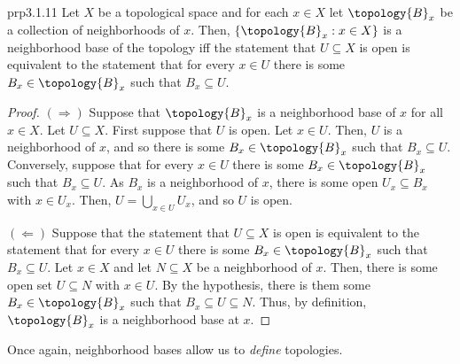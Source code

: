 \begin{prp}{}{prp3.1.11}
Let $X$ be a topological space and for each $x\in X$ let $\topology{B}_x$ be a collection of neighborhoods of $x$.  Then, $\{ \topology{B}_x:x\in X\}$ is a neighborhood base of the topology iff the statement that $U\subseteq X$ is open is equivalent to the statement that for every $x\in U$ there is some $B_x\in \topology{B}_x$ such that $B_x\subseteq U$.
\begin{proof}
$(\Rightarrow )$ Suppose that $\topology{B}_x$ is a neighborhood base of $x$ for all $x\in X$.  Let $U\subseteq X$.  First suppose that $U$ is open.  Let $x\in U$.  Then, $U$ is a neighborhood of $x$, and so there is some $B_x\in \topology{B}_x$ such that $B_x\subseteq U$.  Conversely, suppose that for every $x\in U$ there is some $B_x\in \topology{B}_x$ such that $B_x\subseteq U$.  As $B_x$ is a neighborhood of $x$, there is some open $U_x\subseteq B_x$ with $x\in U_x$.  Then, $U=\bigcup _{x\in U}U_x$, and so $U$ is open.

\blankline
\noindent
$(\Leftarrow )$ Suppose that the statement that $U\subseteq X$ is open is equivalent to the statement that for every $x\in U$ there is some $B_x\in \topology{B}_x$ such that $B_x\subseteq U$.  Let $x\in X$ and let $N\subseteq X$ be a neighborhood of $x$.  Then, there is some open set $U\subseteq N$ with $x\in U$.  By the hypothesis, there is them some $B_x\in \topology{B}_x$ such that $B_x\subseteq U\subseteq N$.  Thus, by definition, $\topology{B}_x$ is a neighborhood base at $x$.
\end{proof}
\end{prp}
Once again, neighborhood bases allow us to \emph{define} topologies.
